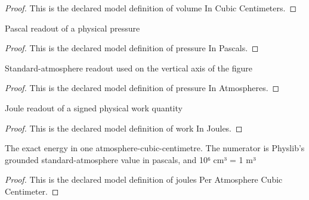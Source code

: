 \begin{proof}
  This is the declared model definition of volume In Cubic Centimeters.
\end{proof}
\begin{definition}
  \label{def:physics:phyx-mini-0417:phyxminiproblems-problemphyxmini0417-pressureinpascals}
  Pascal readout of a physical pressure
\end{definition}
\begin{proof}
  This is the declared model definition of pressure In Pascals.
\end{proof}
\begin{definition}
  \label{def:physics:phyx-mini-0417:phyxminiproblems-problemphyxmini0417-pressureinatmospheres}
  Standard-atmosphere readout used on the vertical axis of the figure
\end{definition}
\begin{proof}
  This is the declared model definition of pressure In Atmospheres.
\end{proof}
\begin{definition}
  \label{def:physics:phyx-mini-0417:phyxminiproblems-problemphyxmini0417-workinjoules}
  Joule readout of a signed physical work quantity
\end{definition}
\begin{proof}
  This is the declared model definition of work In Joules.
\end{proof}
\begin{definition}
  \label{def:physics:phyx-mini-0417:phyxminiproblems-problemphyxmini0417-joulesperatmospherecubiccentimeter}
  The exact energy in one atmosphere-cubic-centimetre. The numerator is Physlib's grounded standard-atmosphere value in pascals, and 10⁶ cm³ = 1 m³
\end{definition}
\begin{proof}
  This is the declared model definition of joules Per Atmosphere Cubic Centimeter.
\end{proof}
